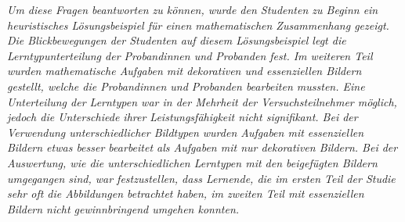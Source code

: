 \textit{Um diese Fragen beantworten zu können, wurde den Studenten zu Beginn ein heuristisches Lösungsbeispiel für einen mathematischen Zusammenhang gezeigt. Die Blickbewegungen der Studenten auf diesem Lösungsbeispiel legt die Lerntypunterteilung der Probandinnen und Probanden fest. Im weiteren Teil wurden mathematische Aufgaben mit dekorativen und essenziellen Bildern gestellt, welche die Probandinnen und Probanden bearbeiten mussten. Eine Unterteilung der Lerntypen war in der Mehrheit der Versuchsteilnehmer möglich, jedoch die Unterschiede ihrer Leistungsfähigkeit nicht signifikant. Bei der Verwendung unterschiedlicher Bildtypen wurden Aufgaben mit essenziellen Bildern etwas besser bearbeitet als Aufgaben mit nur dekorativen Bildern. Bei der Auswertung, wie die unterschiedlichen Lerntypen mit den beigefügten Bildern umgegangen sind, war festzustellen, dass Lernende, die im ersten Teil der Studie sehr oft die Abbildungen betrachtet haben, im zweiten Teil mit essenziellen Bildern nicht gewinnbringend umgehen konnten.}


\tableofcontents %







\printbibliography
\clearpage

\listoffigures %

\printacronyms[title={Abkürzungsverzeichnis}] %

\listoftables %

\onehalfspacing
